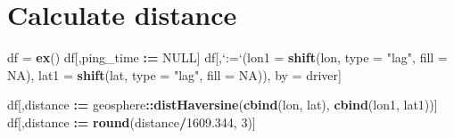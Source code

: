 \documentclass[]{article}
\newenvironment{Shaded}{\begin{snugshade}}{\end{snugshade}}
\newcommand{\DataTypeTok}[1]{\textcolor[rgb]{0.13,0.29,0.53}{#1}}
\newcommand{\DecValTok}[1]{\textcolor[rgb]{0.00,0.00,0.81}{#1}}
\newcommand{\ErrorTok}[1]{\textcolor[rgb]{0.64,0.00,0.00}{\textbf{#1}}}
\newcommand{\FloatTok}[1]{\textcolor[rgb]{0.00,0.00,0.81}{#1}}
\newcommand{\KeywordTok}[1]{\textcolor[rgb]{0.13,0.29,0.53}{\textbf{#1}}}
\newcommand{\NormalTok}[1]{#1}
\newcommand{\OperatorTok}[1]{\textcolor[rgb]{0.81,0.36,0.00}{\textbf{#1}}}
\newcommand{\OtherTok}[1]{\textcolor[rgb]{0.56,0.35,0.01}{#1}}
\newcommand{\StringTok}[1]{\textcolor[rgb]{0.31,0.60,0.02}{#1}}
\begin{document}
\hypertarget{calculate-distance}{%
\section{Calculate distance}\label{calculate-distance}}

\begin{Shaded}
\begin{Highlighting}[]
\NormalTok{df =}\StringTok{ }\KeywordTok{ex}\NormalTok{()}
\NormalTok{df[,ping_time }\OperatorTok{:}\ErrorTok{=}\StringTok{ }\OtherTok{NULL}\NormalTok{]}
\NormalTok{df[,}\StringTok{`}\DataTypeTok{:=}\StringTok{`}\NormalTok{(}\DataTypeTok{lon1 =} \KeywordTok{shift}\NormalTok{(lon, }\DataTypeTok{type =} \StringTok{"lag"}\NormalTok{, }\DataTypeTok{fill =} \OtherTok{NA}\NormalTok{),}
         \DataTypeTok{lat1 =} \KeywordTok{shift}\NormalTok{(lat, }\DataTypeTok{type =} \StringTok{"lag"}\NormalTok{, }\DataTypeTok{fill =} \OtherTok{NA}\NormalTok{)), }
\NormalTok{   by =}\StringTok{ }\NormalTok{driver]}

\NormalTok{df[,distance }\OperatorTok{:}\ErrorTok{=}\StringTok{ }\NormalTok{geosphere}\OperatorTok{::}\KeywordTok{distHaversine}\NormalTok{(}\KeywordTok{cbind}\NormalTok{(lon, lat), }
                                         \KeywordTok{cbind}\NormalTok{(lon1, lat1))]}
\NormalTok{df[,distance }\OperatorTok{:}\ErrorTok{=}\StringTok{ }\KeywordTok{round}\NormalTok{(distance}\OperatorTok{/}\FloatTok{1609.344}\NormalTok{, }\DecValTok{3}\NormalTok{)]}
\end{Highlighting}
\end{Shaded}

\begin{Shaded}
\end{Shaded}
\end{document}
